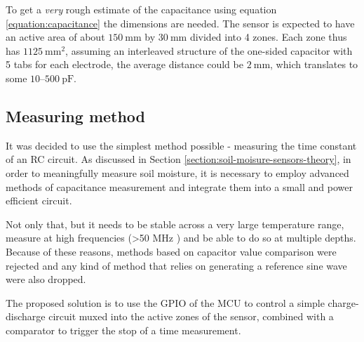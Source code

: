 To get a \emph{very} rough estimate of the capacitance using equation \ref{equation:capacitance} the dimensions are needed. The sensor is expected to have an active area of about $150~\mathrm{mm}$ by $30~\mathrm{mm}$ divided into 4 zones. Each zone thus has $1125~\mathrm{mm^2}$, assuming an interleaved structure of the one-sided capacitor with 5 tabs for each electrode, the average distance could be $2~\mathrm{mm}$, which translates to some $10\text{--}500~\mathrm{pF}$. %

\subsection{\label{section:measuring-method}Measuring method}
It was decided to use the simplest method possible - measuring the time constant of an RC circuit. As discussed in Section \ref{section:soil-moisure-sensors-theory}, in order to meaningfully measure soil moisture, it is necessary to employ advanced methods of capacitance measurement and integrate them into a small and power efficient circuit.

Not only that, but it needs to be stable across a very large temperature range, measure at high frequencies (>50 MHz \cite{meter_group_soil_2023}) and be able to do so at multiple depths. Because of these reasons, methods based on capacitor value comparison were rejected and any kind of method that relies on generating a reference sine wave were also dropped.

The proposed solution is to use the GPIO of the MCU to control a simple charge-discharge circuit muxed into the active zones of the sensor, combined with a comparator to trigger the stop of a time measurement.

